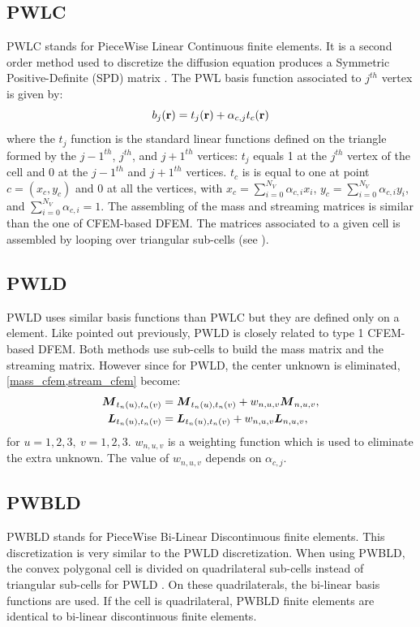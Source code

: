 \subsection{PWLC}
PWLC stands for PieceWise Linear Continuous finite elements. It is a second
order method used to discretize the diffusion equation produces 
a Symmetric Positive-Definite (SPD) matrix \cite{Bailey2008}. The PWL basis 
function associated to $j^{th}$ vertex is given by:
\begin{equation}
  b_j(\mathbf{r}) = t_j(\mathbf{r}) + \alpha_{c,j} t_c(\mathbf{r})
\end{equation}
where the $t_j$ function is the standard linear functions defined on the
triangle formed by the $j-1^{th}$, $j^{th}$, and $j+1^{th}$ vertices:
$t_j$ equals 1 at the $j^{th}$ vertex of the cell and
0 at the $j-1^{th}$ and $j+1^{th}$ vertices. $t_c$ is
is equal to one at point $c=(x_c,y_c)$ and 0 at all the vertices, with $x_c =
\sum_{i=0}^{N_V} \alpha_{c,i} x_i$, $y_c = \sum_{i=0}^{N_V} \alpha_{c,i} y_i$,
and $\sum_{i=0}^{N_V} \alpha_{c,i} = 1$. The assembling of the mass and 
streaming matrices is similar than the one of CFEM-based DFEM. The matrices
associated to a given cell is assembled by looping over triangular sub-cells
(see ).
\subsection{PWLD} \label{subsec_pwld}
PWLD uses similar basis functions than PWLC but they are defined only on a
element. Like pointed out previously, PWLD is closely related to type 1
CFEM-based DFEM. Both methods use sub-cells to build the mass matrix and the
streaming matrix. However since for PWLD, the center unknown is eliminated,
\cref{mass_cfem,stream_cfem} become:
\begin{align}
  \boldsymbol{M}_{t_n(u),t_n(v)} &= \boldsymbol{M}_{t_n(u),t_n(v)} +
  w_{n,u,v}\boldsymbol{M}_{n,u,v},\\
  \boldsymbol{L}_{t_n(u),t_n(v)} &= \boldsymbol{L}_{t_n(u),t_n(v)} + w_{n,u,v} \boldsymbol{L}_{n,u,v}, 
\end{align}
for $u=1,2,3,\ v=1,2,3$. $w_{n,u,v}$ is a weighting function which is used to
eliminate the extra unknown. The value of $w_{n,u,v}$ depends on
$\alpha_{c,j}$.

\subsection{PWBLD}
PWBLD stands for PieceWise Bi-Linear Discontinuous finite elements. This 
discretization is very similar to the PWLD discretization. When using PWBLD, 
the convex polygonal cell is divided on quadrilateral sub-cells instead of
triangular sub-cells for PWLD \cite{Bailey2011}. On these quadrilaterals, 
the bi-linear basis functions are used. If the cell is 
quadrilateral, PWBLD finite elements are identical to bi-linear discontinuous 
finite elements.

